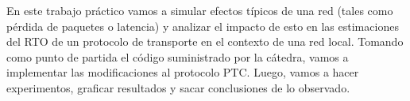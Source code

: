 En este trabajo práctico vamos a simular efectos típicos de una red (tales como pérdida de paquetes o latencia) y analizar el impacto de esto en las estimaciones del RTO de un protocolo de transporte en el contexto de una red local. Tomando como punto de partida el código suministrado por la cátedra, vamos a implementar las modificaciones al protocolo PTC. Luego, vamos a hacer experimentos, graficar resultados y sacar conclusiones de lo observado.